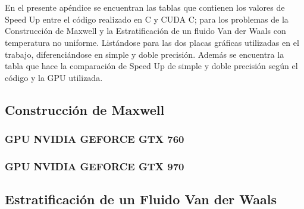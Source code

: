 \chapter{}
\label{ap1}

En el presente apéndice se encuentran las tablas que contienen 
los valores de Speed Up entre el código realizado en C y CUDA C; para los problemas de la Construcción de Maxwell y la Estratificación de un fluido Van der Waals con temperatura no uniforme.
Listándose para las dos placas gráficas utilizadas en el trabajo,
diferenciándose en simple y doble precisión.
Además se encuentra la tabla que hace la comparación de Speed Up
de simple y doble precisión según el código y la GPU utilizada.

\section{Construcción de Maxwell}
\label{apend_MxC}

\subsection{GPU NVIDIA GEFORCE GTX 760}

\label{apend_MxC_760}









\newpage

\subsection{GPU NVIDIA GEFORCE GTX 970}

\label{apend_MxC_970}










\newpage

\section{Estratificación de un Fluido Van der Waals}
\label{apend_VdW}

